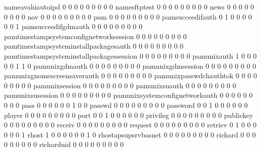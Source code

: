 \documentclass[compress,8pt]{beamer}
\begin{document}
\begin{frame}
\begin{Schunk}
  nameavahiautoipd                           0   0   0   0   0   0   0   0   0
  namesftptest                               0   0   0   0   0   0   0   0   0
  news                                       0   0   0   0   0   0   0   0   0
  nov                                        0   0   0   0   0   0   0   0   0
  pam                                        0   0   0   0   0   0   0   0   0
  pamsucceedifauth                           0   1   0   0   0   0   0   0   1
  pamsucceedifgdmauth                        0   0   0   0   0   0   0   0   0
  pamtimestampsystemconfignetworksession     0   0   0   0   0   0   0   0   0
  pamtimestampsysteminstallpackagesauth      0   0   0   0   0   0   0   0   0
  pamtimestampsysteminstallpackagessession   0   0   0   0   0   0   0   0   0
  pamunixauth                                1   0   0   0   0   0   1   1   0
  pamunixgdmauth                             0   0   0   0   0   0   0   0   0
  pamunixgdmsession                          0   0   0   0   0   0   0   0   0
  pamunixgnomescreensaverauth                0   0   0   0   0   0   0   0   0
  pamunixpasswdchauthtok                     0   0   0   0   0   0   0   0   0
  pamunixsession                             0   0   0   0   0   0   0   0   0
  pamunixsuauth                              0   0   0   0   0   0   0   0   0
  pamunixsusession                           0   0   0   0   0   0   0   0   0
  pamunixsystemconfignetworkauth             0   0   0   0   0   0   0   0   0
  pass                                       0   0   0   0   0   0   1   0   0
  passwd                                     0   0   0   0   0   0   0   0   0
  password                                   0   0   1   0   0   0   0   0   0
  player                                     0   0   0   0   0   0   0   0   0
  port                                       0   0   1   0   0   0   0   0   0
  privileg                                   0   0   0   0   0   0   0   0   0
  publickey                                  0   0   0   0   0   0   0   0   0
  receiv                                     0   0   0   0   0   0   0   0   0
  request                                    0   0   0   0   0   0   0   0   0
  retriev                                    0   1   0   0   0   0   0   0   1
  rhost                                      1   0   0   0   0   0   0   1   0
  rhostapsupsrvbasnet                        0   0   0   0   0   0   0   0   0
  richard                                    0   0   0   0   0   0   0   0   0
  richarduid                                 0   0   0   0   0   0   0   0   0

\end{Schunk}
\end{frame}
\end{document}
